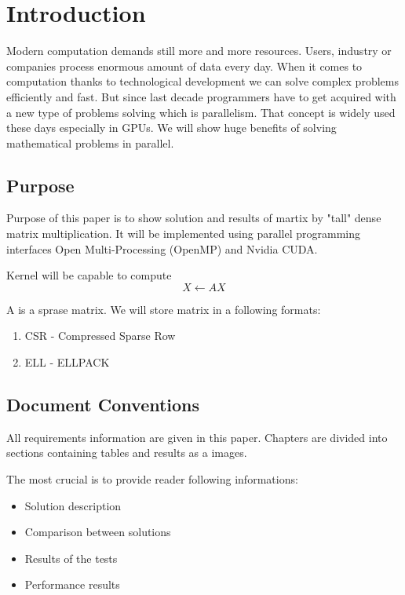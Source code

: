 \documentclass{scrreprt}
\begin{document}
\chapter{Introduction}
Modern computation demands still more and more resources. Users, industry or companies process enormous amount of data every day. When it comes to computation thanks to technological development we can solve complex problems efficiently and fast. But since last decade programmers have to get acquired with a new type of problems solving which is parallelism. That concept is widely used these days especially in GPUs. We will show huge benefits of solving mathematical problems in parallel. 
\section{Purpose}
Purpose of this paper is to show solution and results of martix by "tall" dense matrix multiplication. It will be implemented using parallel programming interfaces Open Multi-Processing (OpenMP) and Nvidia CUDA.  

Kernel will be capable to compute
\begin{equation} \label{eu_eqn}
X \leftarrow AX
\end{equation}

A is a sprase matrix. We will store matrix in a following formats:
\begin{enumerate}
\item CSR - Compressed Sparse Row
\item ELL - ELLPACK

\end{enumerate}




\section{Document Conventions}
All requirements information are given in this paper. Chapters are divided into sections containing tables and results as a images.

The most crucial is to provide reader following informations:
\begin{itemize}
	\item Solution description
	\item Comparison between solutions
	\item Results of the tests
	\item Performance results
\end{itemize}  
\end{document}
